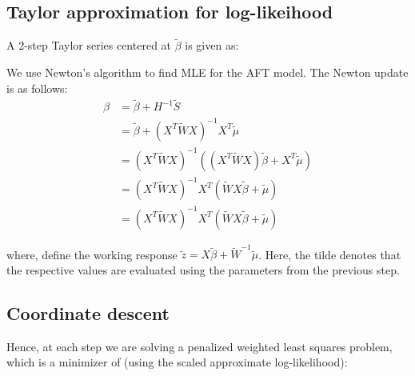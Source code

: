 \documentclass[12pt,a4paper]{report}
\begin{document}

\subsection*{Taylor approximation for log-likeihood}

A 2-step Taylor series centered at $\widetilde \beta$ is given as:

We use Newton's algorithm to find MLE for the AFT model. The Newton update is as follows:
\begin{equation}
\begin{split}
\beta & = \widetilde{\beta} + H^{-1}\widetilde{S} \\ 
 	  & = \widetilde{\beta} + (X^T \widetilde{W} X)^{-1} X^T \widetilde{\mu} \\
 	  & = (X^T \widetilde{W} X)^{-1} ((X^T \widetilde{W} X) \widetilde{\beta} +  X^T \widetilde{\mu} ) \\
 	  & = (X^T \widetilde{W} X)^{-1} X^T (\widetilde{W} X \widetilde{\beta} +  \widetilde{\mu} ) \\
 	  & = (X^T \widetilde{W} X)^{-1} X^T (\widetilde{W} X \widetilde{\beta} +  \widetilde{\mu} )
\end{split}
\end{equation}

where, define the working response $\widetilde{z} = X \widetilde{\beta} + \widetilde{W}^{-1} \widetilde{\mu}$.
Here, the tilde denotes that the respective values are evaluated using the parameters from the previous step.


\subsection*{Coordinate descent}

Hence, at each step we are solving a penalized weighted least squares problem, which is a minimizer of (using the scaled approximate log-likelihood):
\end{document}
